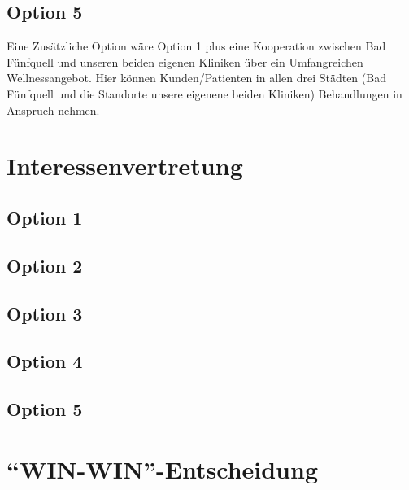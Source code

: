 \subsection*{Option 5}
Eine Zusätzliche Option wäre Option 1 plus eine Kooperation zwischen Bad Fünfquell und unseren beiden eigenen Kliniken über ein Umfangreichen Wellnessangebot. Hier können Kunden/Patienten in allen drei Städten (Bad Fünfquell und die Standorte unsere eigenene beiden Kliniken) Behandlungen in Anspruch nehmen.

\section{Interessenvertretung}

\subsection*{Option 1}

\subsection*{Option 2}

\subsection*{Option 3}

\subsection*{Option 4}

\subsection*{Option 5}

\section{``WIN-WIN''-Entscheidung}

\subsection{}

\subsection{}
